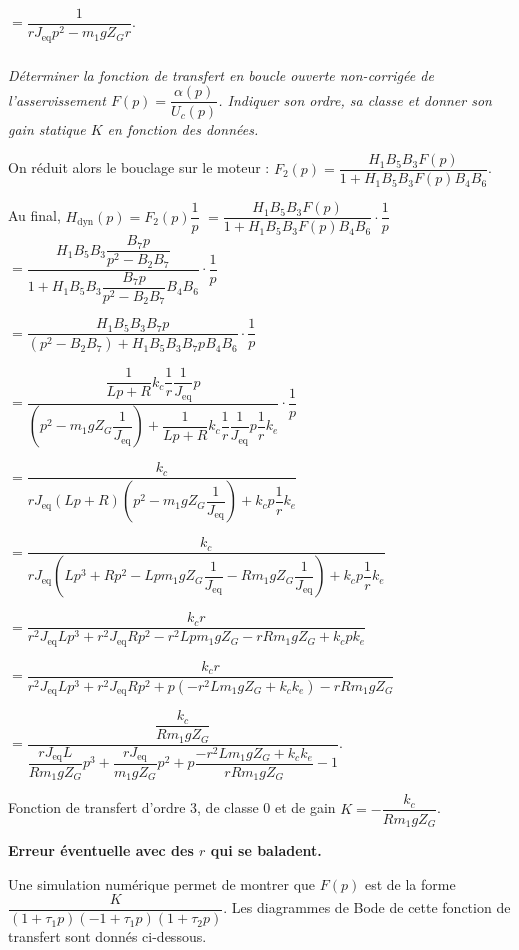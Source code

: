 \begin{multicols}{2}
\begin{corrige}
    $=\dfrac{1}{r J_{\text{eq}}p^2-m_1gZ_Gr}$.


\end{corrige}
\else
\fi


\subparagraph{} \textit{Déterminer la fonction de transfert en boucle ouverte non-corrigée de l'asservissement $ F(p)= \dfrac{\alpha (p)}{U_c (p)}$.
Indiquer son ordre, sa classe et donner son gain statique $K$ en fonction des données.}
\ifprof
\begin{corrige}

On réduit alors le bouclage sur le moteur : $F_2(p)=\dfrac{H_1B_5B_3 F(p)}{1+H_1B_5B_3 F(p)B_4 B_6}$. 

Au final, $H_{\text{dyn}}(p) = F_2 (p)\dfrac{1}{p}$ $=\dfrac{H_1B_5B_3 F(p)}{1+H_1B_5B_3 F(p)B_4 B_6} \cdot\dfrac{1}{p}$ $=\dfrac{H_1B_5B_3 \dfrac{B_7 p}{p^2-B_2B_7}}{1+H_1B_5B_3 \dfrac{B_7 p}{p^2-B_2B_7}B_4 B_6} \cdot\dfrac{1}{p}$

$=\dfrac{H_1B_5B_3 B_7 p}{\left(p^2-B_2B_7 \right)+H_1B_5B_3 B_7 pB_4 B_6} \cdot\dfrac{1}{p}$

$=\dfrac{\dfrac{1}{Lp + R}k_c\dfrac{1}{r} \dfrac{1}{J_{\text{eq}}} p}{\left(p^2-m_1gZ_G\dfrac{1}{J_{\text{eq}}} \right)+\dfrac{1}{Lp + R}k_c\dfrac{1}{r} \dfrac{1}{J_{\text{eq}}} p\dfrac{1}{r} k_e} \cdot\dfrac{1}{p}$

$=\dfrac{k_c }{ r J_{\text{eq}} \left(Lp + R\right) \left(p^2-m_1gZ_G\dfrac{1}{J_{\text{eq}}} \right)+k_c p\dfrac{1}{r} k_e} $


$=\dfrac{k_c }{ r J_{\text{eq}}  \left(Lp^3 + Rp^2-Lpm_1gZ_G\dfrac{1}{J_{\text{eq}}} - Rm_1gZ_G\dfrac{1}{J_{\text{eq}}} \right)+k_c p\dfrac{1}{r} k_e} $

$=\dfrac{k_c r}{   r^2 J_{\text{eq}}Lp^3 + r^2 J_{\text{eq}}Rp^2-r^2 Lpm_1gZ_G -r  Rm_1gZ_G +k_c p k_e} $

$=\dfrac{k_c r}{   r^2 J_{\text{eq}}Lp^3 + r^2 J_{\text{eq}}Rp^2+p\left(-r^2 Lm_1gZ_G  +k_c  k_e\right)-r  Rm_1gZ_G} $

$=\dfrac{\dfrac{k_c }{ Rm_1gZ_G}}{   \dfrac{r J_{\text{eq}}L}{ Rm_1gZ_G}p^3 + \dfrac{r J_{\text{eq}}}{  m_1gZ_G}p^2+p\dfrac{-r^2 Lm_1gZ_G  +k_c  k_e}{r  Rm_1gZ_G}-1} $.

Fonction de transfert d'ordre 3, de classe 0 et de gain $K=-\dfrac{k_c }{ Rm_1gZ_G}$.

\textbf{Erreur éventuelle avec des $r$ qui se baladent.}
\end{corrige}
\else
\fi

\ifprof
\else
Une simulation numérique permet de montrer que $F(p)$ est de la forme $\dfrac{K}{(1+ \tau_1p)(-1+ \tau_1p)(1+ \tau_2p)}$. Les diagrammes de Bode de cette fonction de transfert sont donnés ci-dessous.


\end{multicols}
